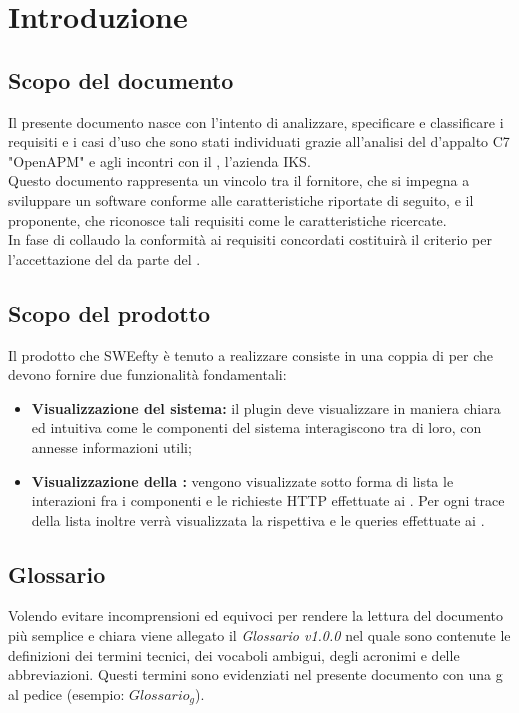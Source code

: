 \section{Introduzione} \label{intro}
	\subsection{Scopo del documento}
	Il presente documento nasce con l'intento di analizzare, specificare e classificare i requisiti e i casi d'uso che sono stati individuati grazie all'analisi del  d'appalto C7 "OpenAPM" e agli incontri con il , l'azienda IKS.\\
	Questo documento rappresenta un vincolo tra il fornitore, che si impegna a sviluppare un software conforme alle caratteristiche riportate di seguito, e il proponente, che riconosce tali requisiti come le caratteristiche ricercate.\\
	In fase di collaudo la conformità ai requisiti concordati costituirà il criterio per l'accettazione del  da parte del .

	\subsection{Scopo del prodotto}
	Il prodotto che SWEefty è tenuto a realizzare consiste in una coppia di  per  che devono fornire due funzionalità fondamentali:
	\begin{itemize}
		\item \textbf{Visualizzazione  del sistema:} il plugin deve visualizzare in maniera chiara ed intuitiva come le componenti del sistema interagiscono tra di loro, con annesse informazioni utili;
		\item \textbf{Visualizzazione della :} vengono visualizzate sotto forma di lista le interazioni fra i componenti e le richieste HTTP effettuate ai . Per ogni trace della lista inoltre verrà visualizzata la rispettiva  e le queries effettuate ai .
	\end{itemize}

	\subsection{Glossario}
		Volendo evitare incomprensioni  ed equivoci per rendere la lettura del documento più semplice e chiara viene allegato il \emph{Glossario v1.0.0} nel quale sono contenute le definizioni dei termini tecnici, dei vocaboli ambigui, degli acronimi e delle abbreviazioni. Questi termini sono evidenziati nel presente documento con una g al pedice (esempio: $Glossario_{g}$).
